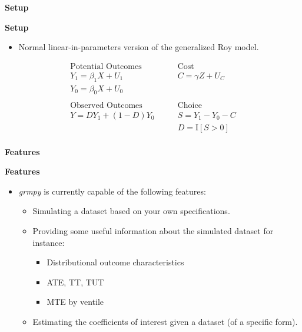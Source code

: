 \begin{frame}\begin{center}
\LARGE\textbf{Setup}
\end{center}\end{frame}



\begin{frame}
\textbf{Setup}
\begin{itemize}\setlength\itemsep{1em}
\item Normal linear-in-parameters version of the generalized Roy model.
\end{itemize}
\begin{align*}
\text{Potential Outcomes} &\qquad \text{Cost} \\
Y_1 = \beta_1 X + U_1      &\qquad C = \gamma Z + U_C \\
Y_0 = \beta_0 X + U_0      &\qquad \\
    & \\
\text{Observed Outcomes}  &\qquad \text{Choice} \\
Y = D Y_1 + (1 - D)Y_0 &\qquad S = Y_1 - Y_0 - C \\
                       &\qquad D = \mathrm{I}[S > 0] \\
\end{align*}
\end{frame}

\begin{frame}\begin{center}
\LARGE\textbf{Features}
\end{center}\end{frame}

\begin{frame}
\textbf{Features}
\begin{itemize}\setlength\itemsep{1em}
\item \textit{grmpy} is currently capable of the following features:
\begin{itemize}\setlength\itemsep{1em}
  \item Simulating a dataset based on your own specifications.
  \item Providing some useful information about the simulated dataset for instance:
    \begin{itemize}\setlength\itemsep{1em}
    \item Distributional outcome characteristics
    \item ATE, TT, TUT
    \item MTE by ventile
    \end{itemize}
  \item Estimating the coefficients of interest given a dataset (of a specific form).
\end{itemize}
\end{itemize}

\end{frame}


